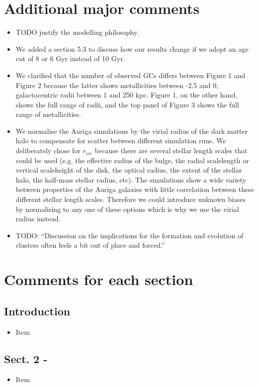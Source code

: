 \documentclass{article}
\begin{document}
\section*{Additional major comments}
\begin{itemize}
\item TODO justify the modelling philosophy.
\item We added a section 5.3 to discuss how our results change if we adopt an
age cut of 8 or 6 Gyr instead of 10 Gyr.
\item We clarified that the number of observed GCs differs between Figure 1 and 
Figure 2 because the latter shows metallicities between -2.5 and 0, galactocentric 
radii between 1 and 250 kpc. Figure 1, on the other hand, shows the full range
of radii, and the top panel of Figure 3 shows the full range of metallicities.
\item We normalise the Auriga simulations by the virial radius of the
dark matter halo to compensate for scatter between different simulation runs. We
deliberately chose for $r_{vir}$ because there are several stellar length scales
that could be used (e.g. the effective radius of the bulge, the radial scalelength
or vertical scaleheight of the disk, the optical radius, the extent of the stellar 
halo, the half-mass stellar radius, etc). The simulations show a wide variety 
between properties of the Auriga galaxies with little correlation between these 
different stellar length scales. Therefore we could introduce unknown biases by 
normalising to any one of these options which is why we use the virial radius instead.
\item TODO: ``Discussion on the implications for the formation and evolution of clusters
    often feels a bit out of place and forced.''

\end{itemize}


\section*{Comments for each section}
\subsection*{Introduction}
\begin{itemize}
\item Item
\end{itemize}

\subsection*{Sect. 2 -}
\begin{itemize}
\item Item
\end{itemize}
\end{document}
